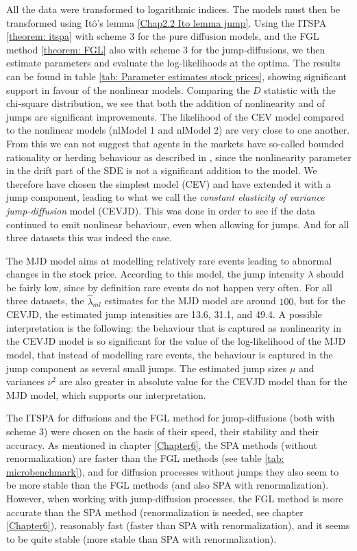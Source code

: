 	All the data were transformed to logarithmic indices. 
	The models must then be transformed using Itô's lemma \ref{Chap2.2 Ito lemma jump}. 
	Using the ITSPA \eqref{theorem: itspa} with scheme 3 for the pure diffusion models, and the FGL method \eqref{theorem: FGL} also with scheme 3 for the jump-diffusions, we then estimate parameters and evaluate the log-likelihoods at the optima.
	The results can be found in table \ref{tab: Parameter estimates stock prices}, showing significant support in favour of the nonlinear models.
	Comparing the $D$ statistic with the chi-square distribution, we see that both the addition of nonlinearity and of jumps are significant improvements.
	The likelihood of the CEV model compared to the nonlinear models (nlModel 1 and nlModel 2) are very close to one another.
	From this we can not suggest that agents in the markets have so-called bounded rationality or herding behaviour as described in \cite{sornette2002nonlinear}, since the nonlinearity parameter in the drift part of the SDE is not a significant addition to the model.
	We therefore have chosen the simplest model (CEV) and have extended it with a jump component, leading to what we call the \textit{constant elasticity of variance jump-diffusion} model (CEVJD).
	This was done in order to see if the data continued to emit nonlinear behaviour, even when allowing for jumps.
	And for all three datasets this was indeed the case.
	
	The MJD model aims at modelling relatively rare events leading to abnormal changes in the stock price.
	According to this model, the jump intensity $\lambda$ should be fairly low, since by definition rare events do not happen very often.
	For all three datasets, the $\hat{\lambda}_{ml}$ estimates for the MJD model are around $100$, but for the CEVJD, the estimated jump intensities are 13.6, 31.1, and 49.4.
	A possible interpretation is the following:
	the behaviour that is captured as nonlinearity in the CEVJD model is so significant for the value of the log-likelihood of the MJD model, that instead of modelling rare events, the behaviour is captured in the jump component as several small jumps.
	The estimated jump sizes $\mu$ and variances $\nu^2$ are also greater in absolute value for the CEVJD model than for the MJD model, which supports our interpretation.
	
	The ITSPA for diffusions and the FGL method for jump-diffusions (both with scheme 3) were chosen on the basis of their speed, their stability and their accuracy.
	As mentioned in chapter \ref{Chapter6}, the SPA methods (without renormalization) are faster than the FGL methods (see table \ref{tab: microbenchmark}), and for diffusion processes without jumps they also seem to be more stable than the FGL methods (and also SPA with renormalization).
	However, when working with jump-diffusion processes, the FGL method is more accurate than the SPA method (renormalization is needed, see chapter \ref{Chapter6}), reasonably fast (faster than SPA with renormalization), and it seems to be quite stable (more stable than SPA with renormalization).
	
